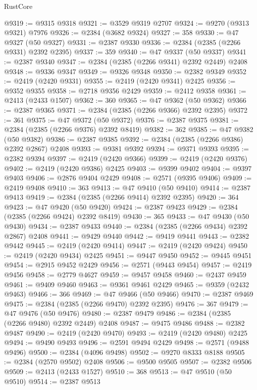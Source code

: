 \begin{lexlean}{RustCore}
\begin{coremodule}
@9319 := @9315 @9318
@9321 := @3529 @9319 @2707
@9324 := @9270 (@9313 @9321) @7976
@9326 := @2384 (@3682 @9324)
@9327 := 358
@9330 := @47 @9327 (@50 @9327)
@9331 := @2387 @9330
@9336 := @2384 (@2385 (@2266 @9331) @2392 @2395)
@9337 := 359
@9340 := @47 @9337 (@50 @9337)
@9341 := @2387 @9340
@9347 := @2384 (@2385 (@2266 @9341) @2392 @2449) @2408
@9348 := @9336 @9347
@9349 := @9326 @9348
@9350 := @2382 @9349
@9352 := @2419 (@2420 @9331)
@9355 := @2419 (@2420 @9341) @2425
@9356 := @9352 @9355
@9358 := @2718 @9356 @2429
@9359 := @2412 @9358
@9361 := @2413 (@2433 @1507)
@9362 := 360
@9365 := @47 @9362 (@50 @9362)
@9366 := @2387 @9365
@9371 := @2384 (@2385 (@2266 @9366) @2392 @2395)
@9372 := 361
@9375 := @47 @9372 (@50 @9372)
@9376 := @2387 @9375
@9381 := @2384 (@2385 (@2266 @9376) @2392 @8419)
@9382 := 362
@9385 := @47 @9382 (@50 @9382)
@9386 := @2387 @9385
@9392 := @2384 (@2385 (@2266 @9386) @2392 @2867) @2408
@9393 := @9381 @9392
@9394 := @9371 @9393
@9395 := @2382 @9394
@9397 := @2419 (@2420 @9366)
@9399 := @2419 (@2420 @9376)
@9402 := @2419 (@2420 @9386) @2425
@9403 := @9399 @9402
@9404 := @9397 @9403
@9406 := @2876 @9404 @2429
@9408 := @2571 (@9395 @9406)
@9409 := @2419 @9408
@9410 := 363
@9413 := @47 @9410 (@50 @9410)
@9414 := @2387 @9413
@9419 := @2384 (@2385 (@2266 @9414) @2392 @2395)
@9420 := 364
@9423 := @47 @9420 (@50 @9420)
@9424 := @2387 @9423
@9429 := @2384 (@2385 (@2266 @9424) @2392 @8419)
@9430 := 365
@9433 := @47 @9430 (@50 @9430)
@9434 := @2387 @9433
@9440 := @2384 (@2385 (@2266 @9434) @2392 @2867) @2408
@9441 := @9429 @9440
@9442 := @9419 @9441
@9443 := @2382 @9442
@9445 := @2419 (@2420 @9414)
@9447 := @2419 (@2420 @9424)
@9450 := @2419 (@2420 @9434) @2425
@9451 := @9447 @9450
@9452 := @9445 @9451
@9454 := @2915 @9452 @2429
@9456 := @2571 (@9443 @9454)
@9457 := @2419 @9456
@9458 := @2779 @4627
@9459 := @9457 @9458
@9460 := @2437 @9459
@9461 := @9409 @9460
@9463 := @9361 @9461 @2429
@9465 := @9359 (@2432 @9463)
@9466 := 366
@9469 := @47 @9466 (@50 @9466)
@9470 := @2387 @9469
@9475 := @2384 (@2385 (@2266 @9470) @2392 @2395)
@9476 := 367
@9479 := @47 @9476 (@50 @9476)
@9480 := @2387 @9479
@9486 := @2384 (@2385 (@2266 @9480) @2392 @2449) @2408
@9487 := @9475 @9486
@9488 := @2382 @9487
@9490 := @2419 (@2420 @9470)
@9493 := @2419 (@2420 @9480) @2425
@9494 := @9490 @9493
@9496 := @2591 @9494 @2429
@9498 := @2571 (@9488 @9496)
@9500 := @2384 (@4096 @9498)
@9502 := @9270 @8333 @8188
@9505 := @2384 (@2570 @9502) @2408
@9506 := @9500 @9505
@9507 := @2382 @9506
@9509 := @2413 (@2433 @1527)
@9510 := 368
@9513 := @47 @9510 (@50 @9510)
@9514 := @2387 @9513

\end{coremodule}
\end{lexlean}

